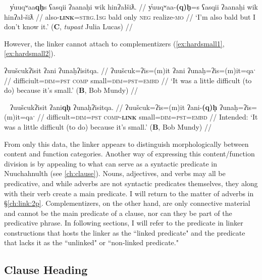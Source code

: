\ex~ \label{ex:alsobald}
\begingl
\glpreamble y̓uuqʷaa\textbf{qḥ}s ʕasqii ʔaanaḥi wik hinʔałšiƛ. //
\gla y̓uuqʷaa-\textbf{(q)ḥ}=s ʕasqii ʔaanaḥi wik hinʔał-šiƛ //
\glb also-\textbf{\textsc{link}}=\textsc{strg.1sg} bald only \textsc{neg} realize-\textsc{mo} //
\glft `I'm also bald but I don't know it.' (\textbf{C}, \textit{tupaat} Julia Lucas) //
\endgl
\xe

However, the linker cannot attach to complementizers (\ref{ex:hardsmall1}, \ref{ex:hardsmall2}).

\ex \label{ex:hardsmall1}
\begingl
\glpreamble ʔuušcukʔisit ʔani ʔunaḥʔisitqa. //
\gla ʔuušcuk=ʔis=(m)it ʔani ʔunaḥ=ʔis=(m)it=qaˑ //
\glb difficiult=\textsc{dim}=\textsc{pst} \textsc{comp} small=\textsc{dim}=\textsc{pst}=\textsc{embd} //
\glft `It was a little difficult (to do) because it's small.' (\textbf{B}, Bob Mundy) //
\endgl
\xe

\ex~ \label{ex:hardsmall2}
\begingl
\glpreamble *ʔuušcukʔisit ʔani\textbf{qḥ} ʔunaḥʔisitqa. //
\gla ʔuušcuk=ʔis=(m)it ʔani-\textbf{(q)ḥ} ʔunaḥ=ʔis=(m)it=qaˑ //
\glb difficult=\textsc{dim}=\textsc{pst} \textsc{comp}-\textbf{\textsc{link}} small=\textsc{dim}=\textsc{pst}=\textsc{embd} //
\glft Intended: `It was a little difficult (to do) because it's small.' (\textbf{B}, Bob Mundy) //
\endgl
\xe

From only this data, the linker appears to distinguish morphologically between content and function categories. Another way of expressing this content/function division is by appealing to what can serve as a syntactic predicate in Nuuchahnulth (see \ref{ch:clause}). Nouns, adjectives, and verbs may all be predicative, and while adverbs are not syntactic predicates themselves, they along with their verb create a main predicate. I will return to the matter of adverbs in \S\ref{ch:link:2p}. Complementizers, on the other hand, are only connective material and cannot be the main predicate of a clause, nor can they be part of the predicative phrase. In following sections, I will refer to the predicate in linker constructions that hosts the linker as the ``linked predicate" and the predicate that lacks it as the ``unlinked" or ``non-linked predicate."


\subsection{Clause Heading} \label{ch:link:clause}

